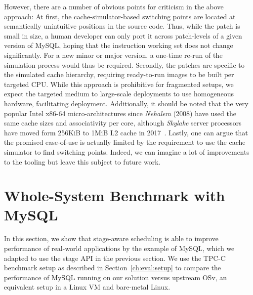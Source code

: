 \documentclass[12pt,a4paper]{book}
\begin{document}
However, there are a number of obvious points for criticism in the above approach:
At first, the cache-simulator-based switching points are located at semantically unintuitive positions in the source code.
Thus, while the patch is small in size, a human developer can only port it across patch-levels of a given version of MySQL, hoping that the instruction working set does not change significantly.
For a new minor or major version, a one-time re-run of the simulation process would thus be required. 
Secondly, the patches are specific to the simulated cache hierarchy, requiring ready-to-run images to be built per targeted CPU.
While this approach is prohibitive for fragmented setups, we expect the targeted medium to large-scale deployments to use homogeneous hardware, facilitating deployment.
Additionally, it should be noted that the very popular Intel x86-64 micro-architectures since \emph{Nehalem} (2008) have used the same cache sizes and associativity per core, although \emph{Skylake} server processors have moved form 256KiB to 1MiB L2 cache in 2017~\cite{nehalemCacheHierarchy,skylakeServerCacheHierarchy}.
Lastly, one can argue that the promised ease-of-use is actually limited by the requirement to use the cache simulator to find switching points.
Indeed, we can imagine a lot of improvements to the tooling but leave this subject to future work.

\section{Whole-System Benchmark with MySQL}\label{ch:eval:perf}
In this section, we show that stage-aware scheduling is able to improve performance of real-world applications by the example of MySQL, which we adapted to use the stage API in the previous section.
We use the TPC-C benchmark setup as described in Section~\ref{ch:eval:setup} to compare the performance of MySQL running on our solution versus upstream OSv, an equivalent setup in a Linux VM and bare-metal Linux.
\end{document}
